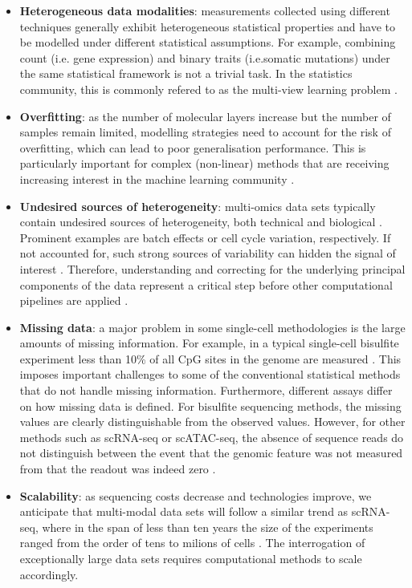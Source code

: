 \begin{itemize}
	\item \textbf{Heterogeneous data modalities}: measurements collected using different techniques generally exhibit heterogeneous statistical properties and have to be modelled under different statistical assumptions. For example, combining count (i.e. gene expression) and binary traits (i.e.somatic mutations) under the same statistical framework is not a trivial task. In the statistics community, this is commonly refered to as the multi-view learning problem \cite{Xu2013,Li2016}.

	\item \textbf{Overfitting}: as the number of molecular layers increase but the number of samples remain limited, modelling strategies need to account for the risk of overfitting, which can lead to poor generalisation performance. This is particularly important for complex (non-linear) methods that are receiving increasing interest in the machine learning community \cite{Zhang2018}.

	\item \textbf{Undesired sources of heterogeneity}: multi-omics data sets typically contain undesired sources of heterogeneity, both technical and biological \cite{Ritchie2015}. Prominent examples are batch effects or cell cycle variation, respectively. If not accounted for, such strong sources of variability can hidden the signal of interest \cite{Buettner2015}. Therefore, understanding and correcting for the underlying principal components of the data represent a critical step before other computational pipelines are applied \cite{Meng2016}.

	\item \textbf{Missing data}: a major problem in some single-cell methodologies is the large amounts of missing information. For example, in a typical single-cell bisulfite experiment less than 10\% of all CpG sites in the genome are measured \cite{Smallwood2014}. This imposes important challenges to some of the conventional statistical methods that do not handle missing information. Furthermore, different assays differ on how missing data is defined. For bisulfite sequencing methods, the missing values are clearly distinguishable from the observed values. However, for other methods such as scRNA-seq or scATAC-seq, the absence of sequence reads do not distinguish between the event that the genomic feature was not measured from that the readout was indeed zero \cite{Clark2018}.

	\item \textbf{Scalability}: as sequencing costs decrease and technologies improve, we anticipate that multi-modal data sets will follow a similar trend as scRNA-seq, where in the span of less than ten years the size of the experiments ranged from the order of tens to milions of cells \cite{Svensson2018}. The interrogation of exceptionally large data sets requires computational methods to scale accordingly.


\end{itemize}
